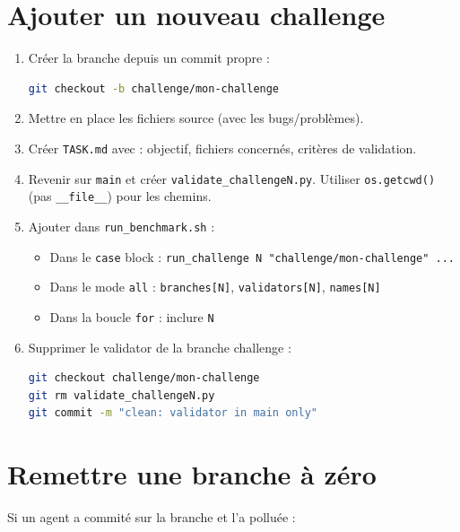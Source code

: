 \documentclass[11pt,a4paper]{article}
\newcommand{\code}[1]{\texttt{#1}}
\begin{document}
\section{Ajouter un nouveau challenge}

\begin{enumerate}
  \item Créer la branche depuis un commit propre :
\begin{lstlisting}[language=bash]
git checkout -b challenge/mon-challenge
\end{lstlisting}
  \item Mettre en place les fichiers source (avec les bugs/problèmes).
  \item Créer \code{TASK.md} avec : objectif, fichiers concernés, critères de validation.
  \item Revenir sur \code{main} et créer \code{validate\_challengeN.py}.
        Utiliser \code{os.getcwd()} (pas \code{\_\_file\_\_}) pour les chemins.
  \item Ajouter dans \code{run\_benchmark.sh} :
        \begin{itemize}
          \item Dans le \code{case} block : \code{run\_challenge N "challenge/mon-challenge" ...}
          \item Dans le mode \code{all} : \code{branches[N]}, \code{validators[N]}, \code{names[N]}
          \item Dans la boucle \code{for} : inclure \code{N}
        \end{itemize}
  \item Supprimer le validator de la branche challenge :
\begin{lstlisting}[language=bash]
git checkout challenge/mon-challenge
git rm validate_challengeN.py
git commit -m "clean: validator in main only"
\end{lstlisting}
\end{enumerate}

\section{Remettre une branche à zéro}

Si un agent a commité sur la branche et l'a polluée :
\end{document}

